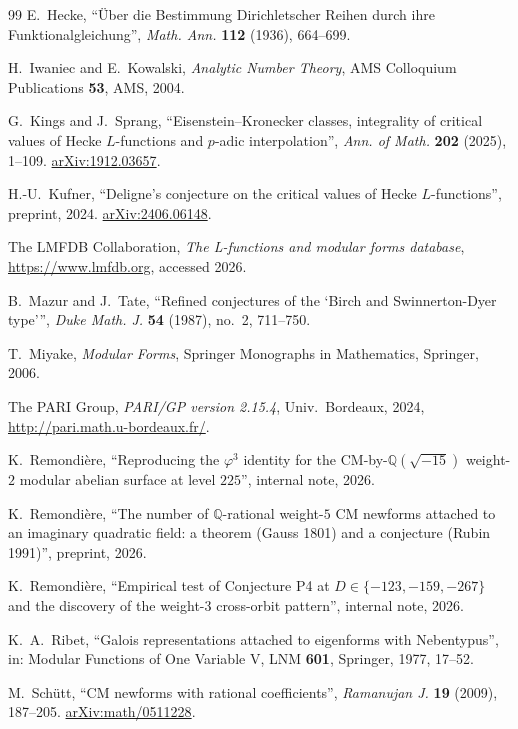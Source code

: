 \documentclass[11pt]{amsart}
\theoremstyle{definition}
\theoremstyle{remark}
\newcommand{\Q}{\mathbb{Q}}
\begin{document}
\begin{thebibliography}{99}
E.~Hecke, ``\"Uber die Bestimmung Dirichletscher Reihen durch ihre
Funktionalgleichung'', \emph{Math. Ann.} \textbf{112} (1936), 664--699.

H.~Iwaniec and E.~Kowalski, \emph{Analytic Number Theory}, AMS
Colloquium Publications \textbf{53}, AMS, 2004.

G.~Kings and J.~Sprang, ``Eisenstein--Kronecker classes, integrality
of critical values of Hecke \(L\)-functions and \(p\)-adic
interpolation'',
\emph{Ann. of Math.} \textbf{202} (2025), 1--109.
\href{https://arxiv.org/abs/1912.03657}{arXiv:1912.03657}.

H.-U.~Kufner, ``Deligne's conjecture on the critical values of Hecke
\(L\)-functions'', preprint, 2024.
\href{https://arxiv.org/abs/2406.06148}{arXiv:2406.06148}.

The LMFDB Collaboration, \emph{The L-functions and modular forms
database}, \url{https://www.lmfdb.org}, accessed 2026.

B.~Mazur and J.~Tate, ``Refined conjectures of the `Birch and
Swinnerton-Dyer type''',
\emph{Duke Math. J.} \textbf{54} (1987), no.~2, 711--750.

T.~Miyake, \emph{Modular Forms}, Springer Monographs in Mathematics,
Springer, 2006.

The PARI Group, \emph{PARI/GP version 2.15.4}, Univ.~Bordeaux, 2024,
\url{http://pari.math.u-bordeaux.fr/}.

K.~Remondi\`ere, ``Reproducing the \(\varphi^{3}\) identity for the
CM-by-\(\Q(\sqrt{-15})\) weight-\(2\) modular abelian surface at level
\(225\)'', internal note, 2026.

K.~Remondi\`ere, ``The number of \(\Q\)-rational weight-\(5\) CM
newforms attached to an imaginary quadratic field: a theorem (Gauss
1801) and a conjecture (Rubin 1991)'', preprint, 2026.

K.~Remondi\`ere, ``Empirical test of Conjecture P4 at \(D \in
\{-123, -159, -267\}\) and the discovery of the weight-\(3\)
cross-orbit pattern'', internal note, 2026.

K.~A.~Ribet, ``Galois representations attached to eigenforms with
Nebentypus'', in: Modular Functions of One Variable V, LNM
\textbf{601}, Springer, 1977, 17--52.

M.~Sch\"utt, ``CM newforms with rational coefficients'',
\emph{Ramanujan J.} \textbf{19} (2009), 187--205.
\href{https://arxiv.org/abs/math/0511228}{arXiv:math/0511228}.


\end{thebibliography}
\end{document}
